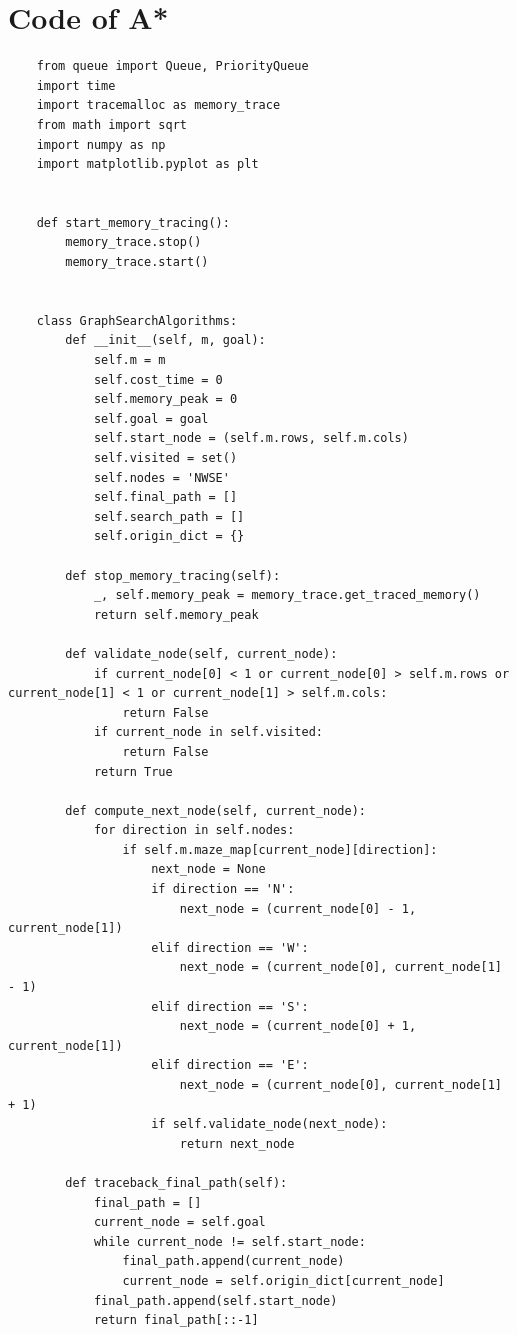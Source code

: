 \documentclass{article}
\begin{document}
\section{Code of A*}
\begin{lstlisting}
    from queue import Queue, PriorityQueue
    import time
    import tracemalloc as memory_trace
    from math import sqrt
    import numpy as np
    import matplotlib.pyplot as plt
    
    
    def start_memory_tracing():
        memory_trace.stop()
        memory_trace.start()
    
    
    class GraphSearchAlgorithms:
        def __init__(self, m, goal):
            self.m = m
            self.cost_time = 0
            self.memory_peak = 0
            self.goal = goal
            self.start_node = (self.m.rows, self.m.cols)
            self.visited = set()
            self.nodes = 'NWSE'
            self.final_path = []
            self.search_path = []
            self.origin_dict = {}
    
        def stop_memory_tracing(self):
            _, self.memory_peak = memory_trace.get_traced_memory()
            return self.memory_peak
    
        def validate_node(self, current_node):
            if current_node[0] < 1 or current_node[0] > self.m.rows or current_node[1] < 1 or current_node[1] > self.m.cols:
                return False
            if current_node in self.visited:
                return False
            return True
    
        def compute_next_node(self, current_node):
            for direction in self.nodes:
                if self.m.maze_map[current_node][direction]:
                    next_node = None
                    if direction == 'N':
                        next_node = (current_node[0] - 1, current_node[1])
                    elif direction == 'W':
                        next_node = (current_node[0], current_node[1] - 1)
                    elif direction == 'S':
                        next_node = (current_node[0] + 1, current_node[1])
                    elif direction == 'E':
                        next_node = (current_node[0], current_node[1] + 1)
                    if self.validate_node(next_node):
                        return next_node
    
        def traceback_final_path(self):
            final_path = []
            current_node = self.goal
            while current_node != self.start_node:
                final_path.append(current_node)
                current_node = self.origin_dict[current_node]
            final_path.append(self.start_node)
            return final_path[::-1]
    

\end{lstlisting}
\end{document}
